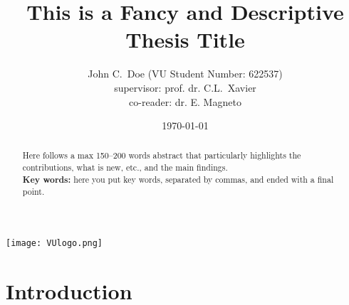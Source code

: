 \documentclass[a4paper,12pt]{article}
\title{This is a Fancy and Descriptive Thesis Title}
\author{
    John C.\ Doe
    (VU Student Number: 622537)
    \\[2ex]
    supervisor: prof. dr. C.L.\ Xavier\\
    co-reader: dr.  E. Magneto
    }
\date{\today}
\begin{document}


\clearpage
\maketitle
\thispagestyle{empty}


\begin{abstract}
\noindent Here follows a max 150--200 words abstract that particularly highlights the contributions, what is new, etc., and the main findings.\\[1ex]
\noindent\textbf{Key words: } here you put key words, separated by commas, and ended with a final point. 
\end{abstract}

\vfill
\centerline{\texttt{[image: VUlogo.png]}}
\clearpage



{
\tableofcontents
}

 \cleardoublepage {}
\clearpage



\section{Introduction} \label{s:intro}
\end{document}
